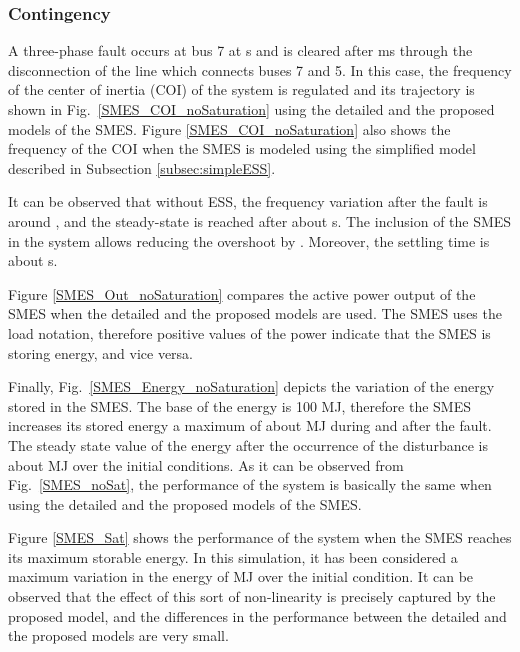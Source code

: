 \documentclass[journal, a4paper]{IEEEtran}
\begin{document}
\subsubsection{Contingency}
\label{subsub:smesdeterm}
A three-phase fault occurs at bus 7 at  s and is cleared after
 ms through the disconnection of the line which connects buses 7
and 5.  In this case, the frequency of the center of inertia (COI) of
the system is regulated and its trajectory is shown in
Fig.~\ref{SMES_COI_noSaturation} using the detailed and the proposed
models of the SMES.  Figure \ref{SMES_COI_noSaturation} also shows the
frequency of the COI when the SMES is modeled using the simplified
model described in Subsection \ref{subsec:simpleESS}.

It can be observed that without ESS, the frequency variation after the
fault is around , and the steady-state is reached after about
 s.  The inclusion of the SMES in the system allows reducing the
overshoot by .  Moreover, the settling time is about  s.

Figure \ref{SMES_Out_noSaturation} compares the active power output of
the SMES when the detailed and the proposed models are used.  The SMES
uses the load notation, therefore positive values of the power
indicate that the SMES is storing energy, and vice versa.

Finally, Fig.~\ref{SMES_Energy_noSaturation} depicts the
  variation of the energy stored in the SMES. The base of the energy
  is 100 MJ, therefore the SMES increases its stored energy a maximum
  of about  MJ during and after the fault.  The steady state value
  of the energy after the occurrence of the disturbance is about 
  MJ over the initial conditions.
As it can be observed from Fig.~\ref{SMES_noSat}, the performance of
the system is basically the same when using the detailed and the
proposed models of the SMES.

Figure \ref{SMES_Sat} shows the performance of the system when the
SMES reaches its maximum storable energy. In this simulation, it
  has been considered a maximum variation in the energy of  MJ
  over the initial condition. It can be observed that the effect of
this sort of non-linearity is precisely captured by the proposed
model, and the differences in the performance between the detailed and
the proposed models are very small.
\end{document}
